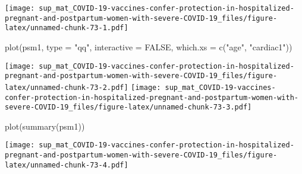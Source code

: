 \documentclass[
]{article}
\newenvironment{Shaded}{\begin{snugshade}}{\end{snugshade}}
\newcommand{\AttributeTok}[1]{\textcolor[rgb]{0.77,0.63,0.00}{#1}}
\newcommand{\CommentTok}[1]{\textcolor[rgb]{0.56,0.35,0.01}{\textit{#1}}}
\newcommand{\ConstantTok}[1]{\textcolor[rgb]{0.00,0.00,0.00}{#1}}
\newcommand{\DecValTok}[1]{\textcolor[rgb]{0.00,0.00,0.81}{#1}}
\newcommand{\FunctionTok}[1]{\textcolor[rgb]{0.00,0.00,0.00}{#1}}
\newcommand{\NormalTok}[1]{#1}
\newcommand{\OtherTok}[1]{\textcolor[rgb]{0.56,0.35,0.01}{#1}}
\newcommand{\SpecialCharTok}[1]{\textcolor[rgb]{0.00,0.00,0.00}{#1}}
\newcommand{\StringTok}[1]{\textcolor[rgb]{0.31,0.60,0.02}{#1}}
\begin{document}
\texttt{[image: sup\_mat\_COVID-19-vaccines-confer-protection-in-hospitalized-pregnant-and-postpartum-women-with-severe-COVID-19\_files/figure-latex/unnamed-chunk-73-1.pdf]}

\begin{Shaded}
\begin{Highlighting}[]
\FunctionTok{plot}\NormalTok{(psm1, }\AttributeTok{type =} \StringTok{"qq"}\NormalTok{, }\AttributeTok{interactive =} \ConstantTok{FALSE}\NormalTok{,}
     \AttributeTok{which.xs =} \FunctionTok{c}\NormalTok{(}\StringTok{"age"}\NormalTok{, }\StringTok{"cardiac1"}\NormalTok{))}
\end{Highlighting}
\end{Shaded}

\texttt{[image: sup\_mat\_COVID-19-vaccines-confer-protection-in-hospitalized-pregnant-and-postpartum-women-with-severe-COVID-19\_files/figure-latex/unnamed-chunk-73-2.pdf]}
\texttt{[image: sup\_mat\_COVID-19-vaccines-confer-protection-in-hospitalized-pregnant-and-postpartum-women-with-severe-COVID-19\_files/figure-latex/unnamed-chunk-73-3.pdf]}

\begin{Shaded}
\begin{Highlighting}[]
\FunctionTok{plot}\NormalTok{(}\FunctionTok{summary}\NormalTok{(psm1))}
\end{Highlighting}
\end{Shaded}

\texttt{[image: sup\_mat\_COVID-19-vaccines-confer-protection-in-hospitalized-pregnant-and-postpartum-women-with-severe-COVID-19\_files/figure-latex/unnamed-chunk-73-4.pdf]}

\begin{Shaded}
\end{Shaded}
\end{document}
